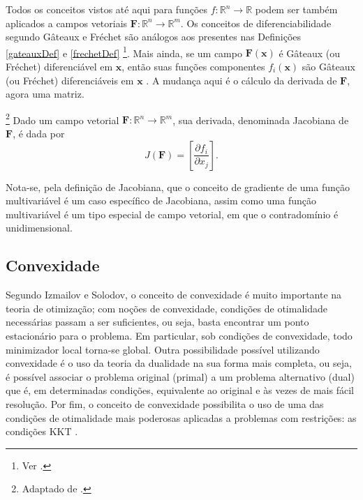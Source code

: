 Todos os conceitos vistos at\'{e} aqui para fun\c{c}\~{o}es $f: \mathbb{R}^{n} \to \mathbb{R}$ podem ser tamb\'{e}m aplicados a campos vetoriais $\mathbf{F}: \mathbb{R}^{n} \to \mathbb{R}^{m}$. Os conceitos de diferenciabilidade segundo G\^{a}teaux e Fr\'{e}chet s\~{a}o an\'{a}logos aos presentes nas Defini\c{c}\~{o}es \ref{gateauxDef} e \ref{frechetDef} \footnote{Ver \cite[pp. 8-9]{guller}.}. Mais ainda, se um campo $\mathbf{F}(\mathbf{x})$ \'{e} G\^{a}teaux (ou Fr\'{e}chet) diferenci\'{a}vel em $\mathbf{x}$, ent\~{a}o suas fun\c{c}\~{o}es componentes $f_i(\mathbf{x})$ s\~{a}o G\^{a}teaux (ou Fr\'{e}chet) diferenci\'{a}veis em $\mathbf{x}$ \cite{guller}. A mudan\c{c}a aqui \'{e} o c\'{a}lculo da derivada de $\mathbf{F}$, agora uma matriz.

\begin{definition}\footnote{Adaptado de \cite[p. 9]{guller}.}
Dado um campo vetorial $\mathbf{F}: \mathbb{R}^{n} \to \mathbb{R}^{m}$, sua derivada, denominada Jacobiana de $\mathbf{F}$, \'{e} dada por
\begin{equation}
J(\mathbf{F}) = \left[ \frac{\partial f_i}{\partial x_j} \right].
\end{equation}
\end{definition}

Nota-se, pela defini\c{c}\~{a}o de Jacobiana, que o conceito de gradiente de uma fun\c{c}\~{a}o multivari\'{a}vel \'{e} um caso espec\'{i}fico de Jacobiana, assim como uma fun\c{c}\~{a}o multivari\'{a}vel \'{e} um tipo especial de campo vetorial, em que o contradom\'{i}nio \'{e} unidimensional.

\subsection{Convexidade}
Segundo Izmailov e Solodov, o conceito de convexidade \'{e} muito importante na teoria de otimiza\c{c}\~{a}o; com no\c{c}\~{o}es de convexidade, condi\c{c}\~{o}es de otimalidade necess\'{a}rias passam a ser suficientes, ou seja, basta encontrar um ponto estacion\'{a}rio para o problema. Em particular, sob condi\c{c}\~{o}es de convexidade, todo minimizador local torna-se global. Outra possibilidade poss\'{i}vel utilizando convexidade \'{e} o uso da teoria da dualidade na sua forma mais completa, ou seja, \'{e} poss\'{i}vel associar o problema original (primal) a um problema alternativo (dual) que \'{e}, em determinadas condi\c{c}\~{o}es, equivalente ao original e \`{a}s vezes de mais f\'{a}cil resolu\c{c}\~{a}o. Por fim, o conceito de convexidade possibilita o uso de uma das condi\c{c}\~{o}es de otimalidade mais poderosas aplicadas a problemas com restri\c{c}\~{o}es: as condi\c{c}\~{o}es KKT \cite{izmailov}.

